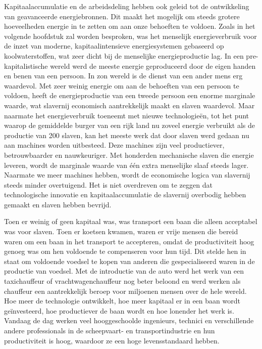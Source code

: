 Kapitaalaccumulatie en de arbeidsdeling hebben ook geleid tot de ontwikkeling van geavanceerde energiebronnen. Dit maakt het mogelijk om steeds grotere hoeveelheden energie in te zetten om aan onze behoeften te voldoen. Zoals in het volgende hoofdstuk zal worden besproken, was het menselijk energieverbruik voor de inzet van moderne, kapitaalintensieve energiesystemen gebaseerd op koolwaterstoffen, wat zeer dicht bij de menselijke energieproductie lag. In een pre-kapitalistische wereld werd de meeste energie geproduceerd door de eigen handen en benen van een persoon. In zo\textquotesingle n wereld is de dienst van een ander mens erg waardevol. Met zeer weinig energie om aan de behoeften van een persoon te voldoen, heeft de energieproductie van een tweede persoon een enorme marginale waarde, wat slavernij economisch aantrekkelijk maakt en slaven waardevol. Maar naarmate het energieverbruik toeneemt met nieuwe technologieën, tot het punt waarop de gemiddelde burger van een rijk land nu zoveel energie verbruikt als de productie van 200 slaven, kan het meeste werk dat door slaven werd gedaan nu aan machines worden uitbesteed. Deze machines zijn veel productiever, betrouwbaarder en nauwkeuriger. Met honderden mechanische slaven die energie leveren, wordt de marginale waarde van één extra menselijke slaaf steeds lager. Naarmate we meer machines hebben, wordt de economische logica van slavernij steeds minder overtuigend. Het is niet overdreven om te zeggen dat technologische innovatie en kapitaalaccumulatie de slavernij overbodig hebben gemaakt en slaven hebben bevrijd.

Toen er weinig of geen kapitaal was, was transport een baan die alleen acceptabel was voor slaven. Toen er koetsen kwamen, waren er vrije mensen die bereid waren om een baan in het transport te accepteren, omdat de productiviteit hoog genoeg was om hen voldoende te compenseren voor hun tijd. Dit stelde hen in staat om voldoende voedsel te kopen van anderen die gespecialiseerd waren in de productie van voedsel. Met de introductie van de auto werd het werk van een taxichauffeur of vrachtwagenchauffeur nog beter beloond en werd werken als chauffeur een aantrekkelijk beroep voor miljoenen mensen over de hele wereld. Hoe meer de technologie ontwikkelt, hoe meer kapitaal er in een baan wordt geïnvesteerd, hoe productiever de baan wordt en hoe lonender het werk is. Vandaag de dag werken veel hooggeschoolde ingenieurs, technici en verschillende andere professionals in de scheepvaart- en transportindustrie en hun productiviteit is hoog, waardoor ze een hoge levensstandaard hebben.


